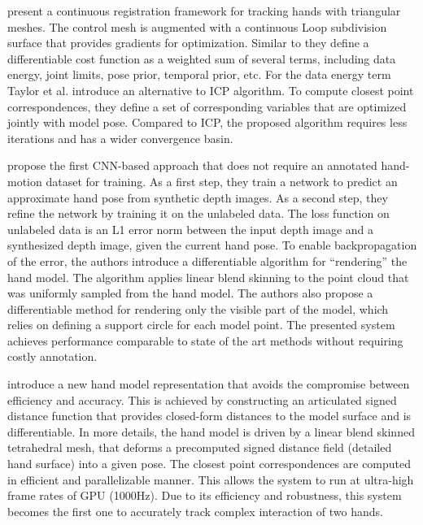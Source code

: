 \hspace{-0.4em}
\textbf{\cite{taylor2016concerto}} 
present a continuous registration framework for tracking hands with triangular meshes. The control mesh is augmented with a continuous Loop subdivision surface that provides gradients for optimization. Similar to \cite{tagliasacchi2015robust} they define a differentiable cost function as a weighted sum of several terms, including data energy, joint limits, pose prior, temporal prior, etc. For the data energy term Taylor et al. introduce an alternative to ICP algorithm. To compute closest point correspondences, they define a set of corresponding variables that are optimized jointly with model pose. Compared to ICP, the proposed algorithm requires less iterations and has a wider convergence basin. 

\hspace{-0.4em}
\textbf{\cite{dibra2017refine}} propose the first CNN-based approach that does not require an annotated hand-motion dataset for training. As a first step, they train a network to predict an approximate hand pose from synthetic depth images. As a second step, they refine the network by training it on the unlabeled data. The loss function on unlabeled data is an L1 error norm between the input depth image and a synthesized depth image, given the current hand pose. To enable backpropagation of the error, the authors introduce a differentiable algorithm for “rendering” the hand model. The algorithm applies linear blend skinning to the point cloud that was uniformly sampled from the hand model. The authors also propose a differentiable method for rendering only the visible part of the model, which relies on defining a support circle for each model point. The presented system achieves performance comparable to state of the art methods without requiring costly annotation.

\hspace{-0.4em}
\textbf{\cite{taylor2017articulated}} 
introduce a new hand model representation that avoids the compromise between efficiency and accuracy. This is achieved by constructing an articulated signed distance function that provides closed-form distances to the model surface and is differentiable. In more details, the hand model is driven by a linear blend skinned tetrahedral mesh, that deforms a precomputed signed distance field (detailed hand surface) into a given pose. The closest point correspondences are computed in efficient and parallelizable manner. This allows the system to run at ultra-high frame rates of GPU (1000Hz). Due to its efficiency and robustness, this system becomes the first one to accurately track complex interaction of two hands.

